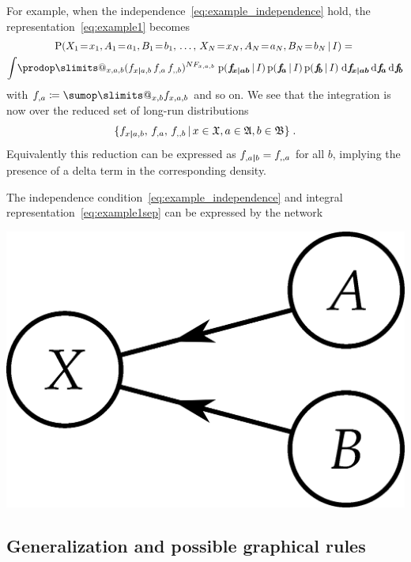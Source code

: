 \documentclass[\ifafour a4paper,12pt,\else a5paper,10pt,\fi%
onecolumn,oneside,article,%
british%
]{memoir}
\makeatletter
\theoremstyle{remark}
\theoremstyle{innote}
\def\sum{\DOTSI\sumop\slimits@}
\def\prod{\DOTSI\prodop\slimits@}
\newcommand*{\di}{\mathrm{d}}%
\newcommand*{\defd}{\coloneqq}
\DeclarePairedDelimiter\set{\{}{\}}
\newcommand*{\pf}{\mathrm{p}}%
\newcommand*{\p}{\mathrm{P}}%
\renewcommand*{\|}[1][]{\nonscript\,#1\vert\nonscript\,\mathopen{}}
\renewcommand*{\=}{\TextOrMath\texteq\eq}
\newcommand*{\X}[1]{X_{#1}}
\newcommand*{\x}[1]{x_{#1}}
\newcommand*{\A}[1]{A_{#1}}
\newcommand*{\va}[1]{a_{#1}}
\newcommand*{\B}[1]{B_{#1}}
\newcommand*{\vb}[1]{b_{#1}}
\newcommand*{\sX}{\mathfrak{X}}
\newcommand*{\sA}{\mathfrak{A}}
\newcommand*{\sB}{\mathfrak{B}}
\newcommand*{\ff}[1]{f_{#1}}
\newcommand*{\ffb}[1]{\bm{f_{\!#1}}}
\newcommand*{\FF}[1]{F_{#1}}
\newcommand*{\bcond}[1][]{\nonscript\,#1\bm{\vert}\nonscript\;\mathopen{}}
\makeatother
\begin{document}
For example, when the independence~\eqref{eq:example_independence} hold,
the representation~\eqref{eq:example1} becomes
\begin{multline}
  \label{eq:example1sep}
  \p( \X{1}\=\x{1}, \A{1}\=\va{1}, \B{1}\=\vb{1},\, \dotsc,\,
   \X{N}\=\x{N}, \A{N}\=\va{N}, \B{N}\=\vb{N} \| I) ={}\\
     \int\!\prod_{x,a,b}
     (\ff{x \bcond a,b}\, \ff{,a}\, \ff{,,b})^{N \FF{x,a,b}}\;%
\pf(\ffb{x \bcond ab}\|I)\,\pf(\ffb{a}\|I)\,\pf(\ffb{b}\|I)
\;\di\ffb{x \bcond ab} \,\di\ffb{a} \,\di\ffb{b}
\end{multline}
with $\ff{,a} \defd \sum_{x,b}\ff{x,a,b}$ and so on. We see that the
integration is now over the reduced set of long-run distributions
\begin{equation}
  \label{eq:subset_freqs}
  \set{\ff{x \bcond a,b},\, \ff{,a},\, \ff{,,b} \|
    x \in \sX, a \in \sA, b \in \sB} \;.
\end{equation}
Equivalently this reduction can be expressed as
$\ff{,a \bcond b} = \ff{,,a}$ for all $b$, implying the presence of a delta
term in the corresponding density.

The independence condition~\eqref{eq:example_independence} and
integral representation~\eqref{eq:example1sep} can be expressed by the network
\begin{center}%
\includegraphics[scale=0.5]{bayesnet3s.png}
\end{center}%

\subsection{Generalization and possible graphical rules}
\label{sec:graph_repr_gen}
\end{document}
